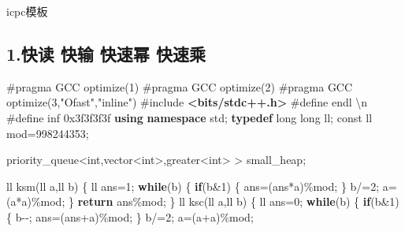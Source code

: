\documentclass[
]{article}
\author{}
\date{}
\newenvironment{Shaded}{}{}
\newcommand{\AttributeTok}[1]{\textcolor[rgb]{0.49,0.56,0.16}{#1}}
\newcommand{\BaseNTok}[1]{\textcolor[rgb]{0.25,0.63,0.44}{#1}}
\newcommand{\CharTok}[1]{\textcolor[rgb]{0.25,0.44,0.63}{#1}}
\newcommand{\ControlFlowTok}[1]{\textcolor[rgb]{0.00,0.44,0.13}{\textbf{#1}}}
\newcommand{\DataTypeTok}[1]{\textcolor[rgb]{0.56,0.13,0.00}{#1}}
\newcommand{\DecValTok}[1]{\textcolor[rgb]{0.25,0.63,0.44}{#1}}
\newcommand{\ImportTok}[1]{\textcolor[rgb]{0.00,0.50,0.00}{\textbf{#1}}}
\newcommand{\KeywordTok}[1]{\textcolor[rgb]{0.00,0.44,0.13}{\textbf{#1}}}
\newcommand{\NormalTok}[1]{#1}
\newcommand{\OperatorTok}[1]{\textcolor[rgb]{0.40,0.40,0.40}{#1}}
\newcommand{\PreprocessorTok}[1]{\textcolor[rgb]{0.74,0.48,0.00}{#1}}
\newcommand{\SpecialCharTok}[1]{\textcolor[rgb]{0.25,0.44,0.63}{#1}}
\begin{document}
icpc模板

\tableofcontents

\hypertarget{1ux5febux8bfb-ux5febux8f93-ux5febux901fux5e42-ux5febux901fux4e58}{%
\subsection{1.快读 快输 快速幂
快速乘}\label{1ux5febux8bfb-ux5febux8f93-ux5febux901fux5e42-ux5febux901fux4e58}}

\begin{Shaded}
\begin{Highlighting}[]
\PreprocessorTok{\#pragma GCC optimize(1)}
\PreprocessorTok{\#pragma GCC optimize(2)}
\PreprocessorTok{\#pragma GCC optimize(3,"Ofast","inline")}
\PreprocessorTok{\#include }\ImportTok{\textless{}bits/stdc++.h\textgreater{}}
\PreprocessorTok{\#define endl }\CharTok{\textquotesingle{}}\SpecialCharTok{\textbackslash{}n}\CharTok{\textquotesingle{}}
\PreprocessorTok{\#define inf }\BaseNTok{0x3f3f3f3f}
\KeywordTok{using} \KeywordTok{namespace}\NormalTok{ std}\OperatorTok{;}
\KeywordTok{typedef} \DataTypeTok{long} \DataTypeTok{long}\NormalTok{ ll}\OperatorTok{;}
\AttributeTok{const}\NormalTok{ ll mod}\OperatorTok{=}\DecValTok{998244353}\OperatorTok{;}

\NormalTok{priority\_queue}\OperatorTok{\textless{}}\DataTypeTok{int}\OperatorTok{,}\NormalTok{vector}\OperatorTok{\textless{}}\DataTypeTok{int}\OperatorTok{\textgreater{},}\NormalTok{greater}\OperatorTok{\textless{}}\DataTypeTok{int}\OperatorTok{\textgreater{}} \OperatorTok{\textgreater{}}\NormalTok{ small\_heap}\OperatorTok{;} 

\NormalTok{ll ksm}\OperatorTok{(}\NormalTok{ll a}\OperatorTok{,}\NormalTok{ll b}\OperatorTok{)}
\OperatorTok{\{}
\NormalTok{    ll ans}\OperatorTok{=}\DecValTok{1}\OperatorTok{;}
    \ControlFlowTok{while}\OperatorTok{(}\NormalTok{b}\OperatorTok{)}
    \OperatorTok{\{}
        \ControlFlowTok{if}\OperatorTok{(}\NormalTok{b}\OperatorTok{\&}\DecValTok{1}\OperatorTok{)}
        \OperatorTok{\{}
\NormalTok{            ans}\OperatorTok{=(}\NormalTok{ans}\OperatorTok{*}\NormalTok{a}\OperatorTok{)\%}\NormalTok{mod}\OperatorTok{;}
        \OperatorTok{\}}
\NormalTok{        b}\OperatorTok{/=}\DecValTok{2}\OperatorTok{;}
\NormalTok{        a}\OperatorTok{=(}\NormalTok{a}\OperatorTok{*}\NormalTok{a}\OperatorTok{)\%}\NormalTok{mod}\OperatorTok{;}
    \OperatorTok{\}}
    \ControlFlowTok{return}\NormalTok{ ans}\OperatorTok{\%}\NormalTok{mod}\OperatorTok{;}
\OperatorTok{\}}
\NormalTok{ll ksc}\OperatorTok{(}\NormalTok{ll a}\OperatorTok{,}\NormalTok{ll b}\OperatorTok{)}
\OperatorTok{\{}
\NormalTok{	ll ans}\OperatorTok{=}\DecValTok{0}\OperatorTok{;}
	\ControlFlowTok{while}\OperatorTok{(}\NormalTok{b}\OperatorTok{)}
	\OperatorTok{\{}
		\ControlFlowTok{if}\OperatorTok{(}\NormalTok{b}\OperatorTok{\&}\DecValTok{1}\OperatorTok{)}
		\OperatorTok{\{}
\NormalTok{			b}\OperatorTok{{-}{-};}
\NormalTok{			ans}\OperatorTok{=(}\NormalTok{ans}\OperatorTok{+}\NormalTok{a}\OperatorTok{)\%}\NormalTok{mod}\OperatorTok{;}
		\OperatorTok{\}}
\NormalTok{		b}\OperatorTok{/=}\DecValTok{2}\OperatorTok{;}
\NormalTok{		a}\OperatorTok{=(}\NormalTok{a}\OperatorTok{+}\NormalTok{a}\OperatorTok{)\%}\NormalTok{mod}\OperatorTok{;}
 

\end{Highlighting}
\end{Shaded}
\end{document}
